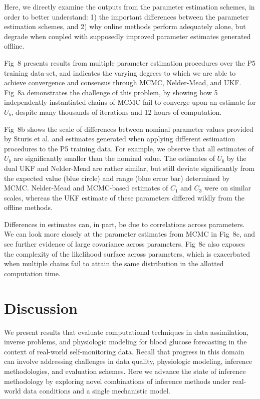 \documentclass[10pt,letterpaper]{article}
\begin{document}
Here, we directly examine the outputs from the parameter estimation schemes, in order to better understand: 1) the important differences between the parameter estimation schemes, and 2) why online methods perform adequately alone, but degrade when coupled with supposedly improved parameter estimates generated offline. 

Fig~8 presents results from multiple parameter estimation procedures over the P5 training data-set, and indicates the varying degrees to which we are able to achieve convergence and consensus through MCMC, Nelder-Mead, and UKF. Fig~8a demonstrates the challenge of this problem, by showing how 5 independently instantiated chains of MCMC fail to converge upon an estimate for $U_b$, despite many thousands of iterations and 12 hours of computation.

Fig~8b shows the scale of differences between nominal parameter values provided by Sturis et al. and estimates generated when applying different estimation procedures to the P5 training data. For example, we observe that all estimates of $U_b$ are significantly smaller than the nominal value. The estimates of $U_b$ by the dual UKF and Nelder-Mead are rather similar, but still deviate significantly from the expected value (blue circle) and range (blue error bar) determined by MCMC. 
Nelder-Mead and MCMC-based estimates of $C_1$ and $C_3$ were on similar scales, whereas the UKF estimate of these parameters differed wildly from the offline methods. 

Differences in estimates can, in part, be due to correlations across parameters. We can look more closely at the parameter estimates from MCMC in Fig~8c, and see further evidence of large covariance across parameters. Fig~8c also exposes the complexity of the likelihood surface across parameters, which is exacerbated when multiple chains fail to attain the same distribution in the allotted computation time.







\section{Discussion}
We present results that evaluate computational techniques in data assimilation, inverse problems, and physiologic modeling for blood glucose forecasting in the context of real-world self-monitoring data. Recall that progress in this domain can involve addressing challenges in data quality, physiologic modeling, inference methodologies, and evaluation schemes. Here we advance the state of inference methodology by exploring novel combinations of inference methods under real-world data conditions and a single mechanistic model. 
\end{document}
